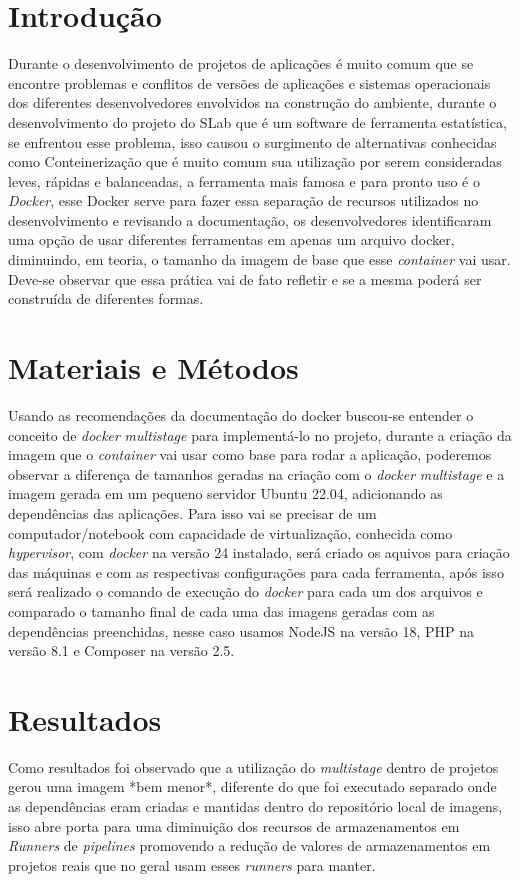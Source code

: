 \documentclass{modelo_banner}
\begin{document}
	\construirtitulo

	\construirautores

	\begin{multicols}{2}	
		\section{Introdução}
		Durante o desenvolvimento de projetos de aplicações é muito comum que se encontre problemas e conflitos de versões de aplicações e sistemas operacionais dos diferentes desenvolvedores envolvidos na construção do ambiente, durante o desenvolvimento do projeto do SLab que é um software de ferramenta estatística, se enfrentou esse problema, isso causou o surgimento de alternativas conhecidas como Conteinerização que é muito comum sua utilização por serem consideradas leves, rápidas e balanceadas, a ferramenta mais famosa e para pronto uso é o \textit{Docker}, esse Docker serve para fazer essa separação de recursos utilizados no desenvolvimento e revisando a documentação, os desenvolvedores identificaram uma opção de usar diferentes ferramentas em apenas um arquivo docker, diminuindo, em teoria, o tamanho da imagem de base que esse \textit{container} vai usar. Deve-se observar que essa prática vai de fato refletir e se a mesma poderá ser construída de diferentes formas.
		\section{Materiais e Métodos}
		Usando as recomendações da documentação do docker buscou-se entender o conceito de \textit{docker} \textit{multistage} para implementá-lo no projeto, durante a criação da imagem que o \textit{container} vai usar como base para rodar a aplicação, poderemos observar a diferença de tamanhos geradas na criação com o \textit{docker} \textit{multistage} e a imagem gerada em um pequeno servidor Ubuntu 22.04, adicionando as dependências das aplicações.
	Para isso vai se precisar de um computador/notebook com capacidade de virtualização, conhecida como \textit{hypervisor}, com \textit{docker} na versão 24 instalado, será criado os aquivos para criação das máquinas e com as respectivas configurações para cada ferramenta, após isso será realizado o comando de execução do \textit{docker} para cada um dos arquivos e comparado o tamanho final de cada uma das imagens geradas com as dependências preenchidas, nesse caso usamos NodeJS na versão 18, PHP na versão 8.1 e Composer na versão 2.5.
		
		\section{Resultados}
			 Como resultados foi observado que a utilização do \textit{multistage} dentro de projetos gerou uma imagem *bem menor*, diferente do que foi executado separado onde as dependências eram criadas e mantidas dentro do repositório local de imagens, isso abre porta para uma diminuição dos recursos de armazenamentos em \textit{Runners} de \textit{pipelines} promovendo a redução de valores de armazenamentos em projetos reais que no geral usam esses \textit{runners} para manter.

\end{multicols}
\end{document}
